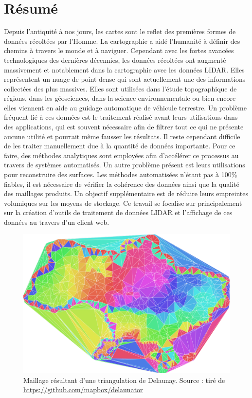 \thispagestyle{noheader}
\chapter*{Résumé} %
\thispagestyle{noheader}

Depuis l'antiquité à nos jours, les cartes sont le reflet des premières formes de données récoltées par l'Homme.
La cartographie a aidé l'humanité à définir des chemins à travers le monde et à naviguer.
Cependant avec les fortes avancées technologiques des dernières décennies, les données récoltées ont augmenté massivement et notablement dans la cartographie avec les données LIDAR. Elles représentent un nuage de point dense qui sont actuellement une des informations collectées des plus massives.
Elles sont utilisées dans l'étude topographique de régions, dans les géosciences, dans la science environnementale ou bien encore elles viennent en aide au guidage automatique de véhicule terrestre. Un problème fréquent lié à ces données est le traitement réalisé avant leurs utilisations dans des applications, qui est souvent nécessaire afin de filtrer tout ce qui ne présente aucune utilité et pourrait même fausser les résultats.
Il reste cependant difficile de les traiter manuellement due à la quantité de données importante. Pour ce faire, des méthodes analytiques sont employées afin d'accélérer ce processus au travers de systèmes automatisés.
Un autre problème présent est leurs utilisations pour reconstruire des surfaces. Les méthodes automatisées n'étant pas à 100\% fiables, il est nécessaire de vérifier la cohérence des données ainsi que la qualité des maillages produits.
Un objectif supplémentaire est de réduire leurs empreintes volumiques sur les moyens de stockage. Ce travail se focalise sur principalement sur la création d'outils de traitement de données LIDAR et l'affichage de ces données au travers d'un client web.


\begin{figure}[htbp!]
    \centering
    \includegraphics[width=0.5\linewidth]{figures/delaunator.png}
    \caption{Maillage résultant d'une triangulation de Delaunay. Source : tiré de \href{https://github.com/mapbox/delaunator}{https://github.com/mapbox/delaunator}}
    \label{fig:my_label}
\end{figure}